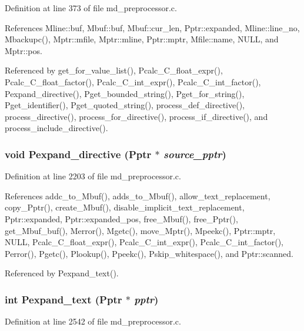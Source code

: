 Definition at line 373 of file md\_\-preprocessor.c.

References Mline::buf, Mbuf::buf, Mbuf::cur\_\-len, Pptr::expanded, Mline::line\_\-no, Mbackupc(), Mptr::mfile, Mptr::mline, Pptr::mptr, Mfile::name, NULL, and Mptr::pos.

Referenced by get\_\-for\_\-value\_\-list(), Pcalc\_\-C\_\-float\_\-expr(), Pcalc\_\-C\_\-float\_\-factor(), Pcalc\_\-C\_\-int\_\-expr(), Pcalc\_\-C\_\-int\_\-factor(), Pexpand\_\-directive(), Pget\_\-bounded\_\-string(), Pget\_\-for\_\-string(), Pget\_\-identifier(), Pget\_\-quoted\_\-string(), process\_\-def\_\-directive(), process\_\-directive(), process\_\-for\_\-directive(), process\_\-if\_\-directive(), and process\_\-include\_\-directive().
\subsubsection{\setlength{\rightskip}{0pt plus 5cm}void Pexpand\_\-directive (\bf{Pptr} $\ast$ {\em source\_\-pptr})}\label{md__preprocessor_8c_f266761f9b2875c8e336313034133ea1}




Definition at line 2203 of file md\_\-preprocessor.c.

References addc\_\-to\_\-Mbuf(), adds\_\-to\_\-Mbuf(), allow\_\-text\_\-replacement, copy\_\-Pptr(), create\_\-Mbuf(), disable\_\-implicit\_\-text\_\-replacement, Pptr::expanded, Pptr::expanded\_\-pos, free\_\-Mbuf(), free\_\-Pptr(), get\_\-Mbuf\_\-buf(), Merror(), Mgetc(), move\_\-Mptr(), Mpeekc(), Pptr::mptr, NULL, Pcalc\_\-C\_\-float\_\-expr(), Pcalc\_\-C\_\-int\_\-expr(), Pcalc\_\-C\_\-int\_\-factor(), Perror(), Pgetc(), Plookup(), Ppeekc(), Pskip\_\-whitespace(), and Pptr::scanned.

Referenced by Pexpand\_\-text().
\subsubsection{\setlength{\rightskip}{0pt plus 5cm}int Pexpand\_\-text (\bf{Pptr} $\ast$ {\em pptr})}\label{md__preprocessor_8c_96dc9d0c7b4e9f7872132290d1cf3ac7}




Definition at line 2542 of file md\_\-preprocessor.c.

